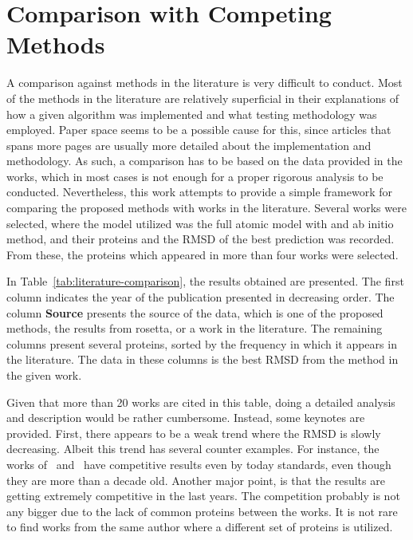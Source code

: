 \section{Comparison with Competing Methods}
\label{sec:competing-methods}

A comparison against methods in the literature is very difficult to conduct.
Most of the methods in the literature are relatively superficial in their
explanations of how a given algorithm was implemented and what testing
methodology was employed. Paper space seems to be a possible cause for this,
since articles that spans more pages are usually more detailed about the
implementation and methodology. As such, a comparison has to be based on the
data provided in the works, which in most cases is not enough for a proper
rigorous analysis to be conducted. Nevertheless, this work attempts to provide
a simple framework for comparing the proposed methods with works in the
literature. Several works were selected, where the model utilized was the
full atomic model with and ab initio method, and their proteins and the RMSD
of the best prediction was recorded. From these, the proteins which appeared in
more than four works were selected.



In Table~\ref{tab:literature-comparison}, the results obtained are presented. The first
column indicates the year of the publication presented in
decreasing order. The column \textbf{Source} presents the source of the data, which is one of the proposed methods, the results
from rosetta, or a work in the literature. The
remaining columns present several proteins, sorted by the frequency in which it
appears in the literature. The data in these columns is the best RMSD from the
method in the given work.

Given that more than 20 works are cited in this table, doing a detailed
analysis and description would be rather cumbersome. Instead, some keynotes are
provided. First, there appears to be a weak trend where the RMSD is slowly
decreasing. Albeit this trend has several counter examples.
For instance, the works of~\cite{cazacu2014steel} and~\cite{judy2009multi}
have competitive results even by today standards, even though they are more than
a decade old. Another major point, is that the results are getting extremely
competitive in the last years. The competition probably is not any bigger due to
the lack of common proteins between the works. It is not rare to find works
from the same author where a different set of proteins is utilized.

